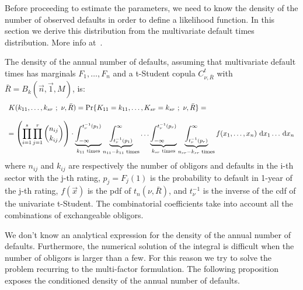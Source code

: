 \documentclass[11pt,fleqn]{book} %
\begin{document}
Before proceeding to estimate the parameters, we need to know the density
of the number of observed defaults in order to define a likelihood 
function. In this section we derive this distribution from the multivariate
default times distribution. More info at~\cite{gordy:2002,roncalli:2004}.

\begin{proposition}
	The density of the annual number of defaults, assuming that multivariate 
	default times has marginals $F_1,\dots,F_n$ and a t-Student copula 
	$C_{\nu,\bar{R}}^t$ with $\bar{R} = B_k(\vec{n},\vec{1},M)$, is:
	\begin{displaymath}
		\begin{array}{l}
			K(k_{11},\dots,k_{sr}\ ;\ \nu, \bar{R}) = 
			\Pr\{K_{11}=k_{11},\dots,K_{sr}=k_{sr}\ ;\ \nu, \bar{R}\} = \\
			\\
			= \left( \displaystyle \prod_{i=1}^s \prod_{j=1}^r \binom{n_{ij}}{k_{ij}} \right) \cdot
			\displaystyle
			\underbrace{\int_{-\infty}^{t_{\nu}^{-1}(p_1)}}_{k_{11} \text{ times}}
			\underbrace{\int_{t_{\nu}^{-1}(p_1)}^{\infty}}_{n_{11}-k_{11} \text{ times}}
			\dots
			\underbrace{\int_{-\infty}^{t_{\nu}^{-1}(p_r)}}_{k_{sr} \text{ times}}
			\underbrace{\int_{t_{\nu}^{-1}(p_r)}^{\infty}}_{n_{sr}-k_{sr} \text{ times}}
			f(x_1,\dots,x_n) \mathop{\,\mathrm{{}d}}\mathopen{} x_1 \dots \mathop{\,\mathrm{{}d}}\mathopen{} x_n
		\end{array}
	\end{displaymath}
	where $n_{ij}$ and $k_{ij}$ are respectively the number of obligors and 
	defaults in the i-th sector with the j-th rating, $p_j = F_j(1)$ 
	is the probability to default in 1-year of the j-th rating, $f(\vec{x})$ 
	is the pdf of $t_n(\nu,\bar{R})$, and $t_{\nu}^{-1}$ is the inverse of the 
	cdf of the univariate t-Student. The combinatorial coefficients take into 
	account all the combinations of exchangeable obligors.
\end{proposition}

We don't know an analytical expression for the density of the annual number 
of defaults. Furthermore, the numerical solution of the integral is difficult 
when the number of obligors is larger than a few. For this reason we try to 
solve the problem recurring to the multi-factor formulation. The following
proposition exposes the conditioned density of the annual number of defaults.
\end{document}
